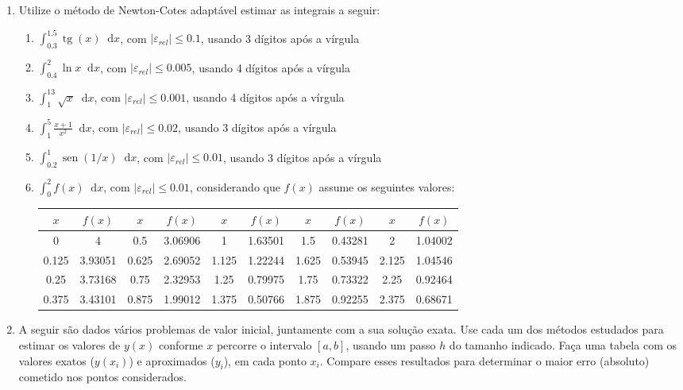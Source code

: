 \documentclass[12pt,a4paper]{article}
\newcommand*\sen{\operatorname{sen}}
\newcommand*\tg{\operatorname{tg}}
\newcommand*\diff{\mathop{}\!\mathrm{d}}
\begin{document}
\begin{enumerate}
\item Utilize o método de Newton-Cotes adaptável estimar as integrais a seguir:
\begin{enumerate}
\item $\int_{0.3}^{1.5} \tg(x)\diff{x}$, com $|\varepsilon_{rel}| \leq 0.1$, usando 3 dígitos após a vírgula
\item $\int_{0.4}^{2} \ln{x}\diff{x}$, com $|\varepsilon_{rel}| \leq 0.005$, usando 4 dígitos após a vírgula
\item $\int_{1}^{13} \sqrt{x}\diff{x}$, com $|\varepsilon_{rel}| \leq 0.001$, usando 4 dígitos após a vírgula
\item $\int_1^5 \frac{x+1}{x^2}\diff{x}$, com $|\varepsilon_{rel}| \leq 0.02$, usando 3 dígitos após a vírgula
\item $\int_{0.2}^{1} \sen(1/x)\diff{x}$, com $|\varepsilon_{rel}| \leq 0.01$, usando 3 dígitos após a vírgula
\item $\int_{0}^{2} f(x)\diff{x}$, com $|\varepsilon_{rel}| \leq 0.01$, considerando que $f(x)$ assume os seguintes valores:
\begin{center}\hspace{-1cm}
\begin{tabular}{|c|c||c|c||c|c||c|c||c|c|}
\hline
$x$ & $f(x)$ & $x$ & $f(x)$ & $x$ & $f(x)$ & $x$ & $f(x)$ & $x$ & $f(x)$\\
\hline
0 & 4 & 0.5 & 3.06906 & 1 & 1.63501 & 1.5 & 0.43281 & 2 & 1.04002\\
\hline
0.125 & 3.93051 & 0.625 & 2.69052 & 1.125 & 1.22244 & 1.625 & 0.53945 & 2.125 & 1.04546\\
\hline
0.25 & 3.73168 & 0.75 & 2.32953 & 1.25 & 0.79975 & 1.75 & 0.73322 & 2.25 & 0.92464\\
\hline
0.375 & 3.43101 & 0.875 & 1.99012 & 1.375 & 0.50766 & 1.875 & 0.92255 & 2.375 & 0.68671\\
\hline
\end{tabular}
\end{center}
\end{enumerate}
\item A seguir são dados vários problemas de valor inicial, juntamente com a sua solução exata. Use cada um dos métodos estudados para estimar os valores de $y(x)$ conforme $x$ percorre o intervalo $[a,b]$, usando um passo $h$ do tamanho indicado. Faça uma tabela com os valores exatos ($y(x_i)$) e aproximados ($y_i$), em cada ponto $x_i$. Compare esses resultados para determinar o maior erro (absoluto) cometido nos pontos considerados.

\end{enumerate}
\end{document}
